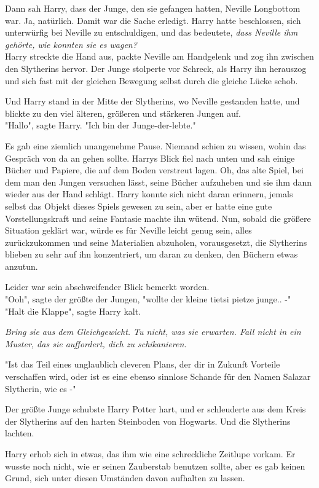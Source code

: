 {Dann sah Harry, dass der Junge, den sie gefangen hatten, Neville Longbottom war. Ja, natürlich. Damit war die Sache erledigt. Harry hatte beschlossen, sich unterwürfig bei Neville zu entschuldigen, und das bedeutete, \emph{dass Neville ihm gehörte, wie konnten sie es wagen?}\\ Harry streckte die Hand aus, packte Neville am Handgelenk und zog ihn zwischen den Slytherins hervor. Der Junge stolperte vor Schreck, als Harry ihn herauszog und sich fast mit der gleichen Bewegung selbst durch die gleiche Lücke schob.

Und Harry stand in der Mitte der Slytherins, wo Neville gestanden hatte, und blickte zu den viel älteren, größeren und stärkeren Jungen auf.\\ "Hallo", sagte Harry. "Ich bin der Junge-der-lebte."

Es gab eine ziemlich unangenehme Pause. Niemand schien zu wissen, wohin das Gespräch von da an gehen sollte. Harrys Blick fiel nach unten und sah einige Bücher und Papiere, die auf dem Boden verstreut lagen. Oh, das alte Spiel, bei dem man den Jungen versuchen lässt, seine Bücher aufzuheben und sie ihm dann wieder aus der Hand schlägt. Harry konnte sich nicht daran erinnern, jemals selbst das Objekt dieses Spiels gewesen zu sein, aber er hatte eine gute Vorstellungskraft und seine Fantasie machte ihn wütend. Nun, sobald die größere Situation geklärt war, würde es für Neville leicht genug sein, alles zurückzukommen und seine Materialien abzuholen, vorausgesetzt, die Slytherins blieben zu sehr auf ihn konzentriert, um daran zu denken, den Büchern etwas anzutun.

Leider war sein abschweifender Blick bemerkt worden.\\ "Ooh", sagte der größte der Jungen, "wollte der kleine tietsi pietze junge.. -"\\ "Halt die Klappe", sagte Harry kalt.

\emph{Bring sie aus dem Gleichgewicht. Tu nicht, was sie erwarten. Fall nicht in ein Muster, das sie auffordert, dich zu schikanieren.}

"Ist das Teil eines unglaublich cleveren Plans, der dir in Zukunft Vorteile verschaffen wird, oder ist es eine ebenso sinnlose Schande für den Namen Salazar Slytherin, wie es -"

Der größte Junge schubste Harry Potter hart, und er schleuderte aus dem Kreis der Slytherins auf den harten Steinboden von Hogwarts. Und die Slytherins lachten.

Harry erhob sich in etwas, das ihm wie eine schreckliche Zeitlupe vorkam. Er wusste noch nicht, wie er seinen Zauberstab benutzen sollte, aber es gab keinen Grund, sich unter diesen Umständen davon aufhalten zu lassen.

}
